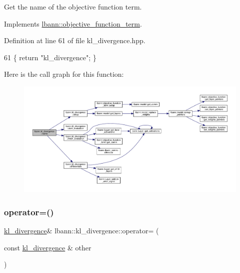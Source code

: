 Get the name of the objective function term. 

Implements \hyperlink{classlbann_1_1objective__function__term_a964fbfad3dd0434aa8f32c5fedf1079a}{lbann\+::objective\+\_\+function\+\_\+term}.



Definition at line 61 of file kl\+\_\+divergence.\+hpp.


\begin{DoxyCode}
61 \{ \textcolor{keywordflow}{return} \textcolor{stringliteral}{"kl\_divergence"}; \}
\end{DoxyCode}
Here is the call graph for this function\+:\nopagebreak
\begin{figure}[H]
\begin{center}
\leavevmode
\includegraphics[width=350pt]{classlbann_1_1kl__divergence_a42f016a75f640cb4ec9ceb9320da4a47_cgraph}
\end{center}
\end{figure}
\mbox{\label{classlbann_1_1kl__divergence_ac70fa0c7c0f1d97402a1ca73c0dfb927}} 
\subsubsection{\texorpdfstring{operator=()}{operator=()}}
{\footnotesize\ttfamily \hyperlink{classlbann_1_1kl__divergence}{kl\+\_\+divergence}\& lbann\+::kl\+\_\+divergence\+::operator= (\begin{DoxyParamCaption}\item[{const \hyperlink{classlbann_1_1kl__divergence}{kl\+\_\+divergence} \&}]{other }\end{DoxyParamCaption})\hspace{0.3cm}{\ttfamily [default]}}

